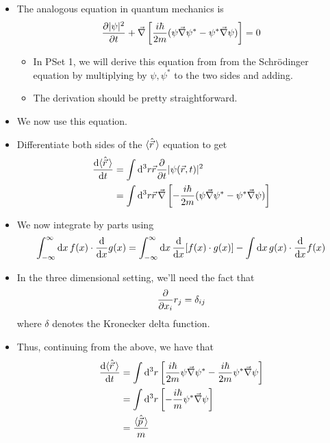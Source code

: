 \documentclass[../notes.tex]{subfiles}
\begin{document}
\begin{itemize}
\begin{itemize}
        \item The analogous equation in quantum mechanics is
        \begin{equation*}
            \pdv{|\psi|^2}{t}+\vec{\nabla}\left[ \frac{i\hbar}{2m}(\psi\vec{\nabla}\psi^*-\psi^*\vec{\nabla}\psi) \right] = 0
        \end{equation*}
        \begin{itemize}
            \item In PSet 1, we will derive this equation from from the Schr\"{o}dinger equation by multiplying by $\psi,\psi^*$ to the two sides and adding.
            \item The derivation should be pretty straightforward.
        \end{itemize}
        \item We now use this equation.
        \item Differentiate both sides of the $\langle{\hat{\vec{r}}}\,\rangle$ equation to get
        \begin{align*}
            \dv{\langle{\hat{\vec{r}}}\,\rangle}{t} &= \int\dd^3r\vec{r}\pdv{t}|\psi(\vec{r},t)|^2\\
            &= \int\dd^3r\vec{r}\,\vec{\nabla}\left[ -\frac{i\hbar}{2m}(\psi\vec{\nabla}\psi^*-\psi^*\vec{\nabla}\psi) \right]
        \end{align*}
        \item We now integrate by parts using
        \begin{equation*}
            \int_{-\infty}^\infty\dd{x}f(x)\cdot\dv{x}g(x) = \int_{-\infty}^\infty\dd{x}\dv{x}[f(x)\cdot g(x)]-\int\dd{x}g(x)\cdot\dv{x}f(x)
        \end{equation*}
        \item In the three dimensional setting, we'll need the fact that
        \begin{equation*}
            \pdv{x_i}r_j = \delta_{ij}
        \end{equation*}
        where $\delta$ denotes the Kronecker delta function.
        \item Thus, continuing from the above, we have that
        \begin{align*}
            \dv{\langle{\hat{\vec{r}}}\,\rangle}{t} &= \int\dd^3r\left[ \frac{i\hbar}{2m}\psi\vec{\nabla}\psi^*-\frac{i\hbar}{2m}\psi^*\vec{\nabla}\psi \right]\\
            &= \int\dd^3r\left[ -\frac{i\hbar}{m}\psi^*\vec{\nabla}\psi \right]\\
            &= \frac{\langle{\hat{\vec{p}}}\,\rangle}{m}
        \end{align*}

\end{itemize}
\end{itemize}
\end{document}
